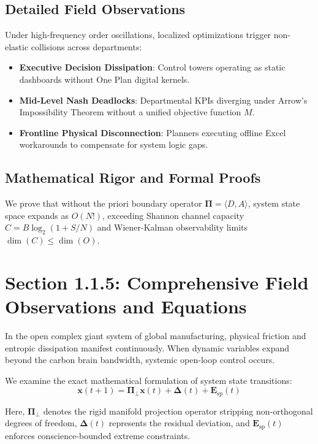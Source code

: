 \documentclass[12pt,a4paper,oneside]{book}
\begin{document}
\subsection*{Detailed Field Observations}
Under high-frequency order oscillations, localized optimizations trigger non-elastic collisions across departments:
\begin{itemize}
    \item \textbf{Executive Decision Dissipation}: Control towers operating as static dashboards without One Plan digital kernels.
    \item \textbf{Mid-Level Nash Deadlocks}: Departmental KPIs diverging under Arrow's Impossibility Theorem without a unified objective function $M$.
    \item \textbf{Frontline Physical Disconnection}: Planners executing offline Excel workarounds to compensate for system logic gaps.
\end{itemize}

\subsection*{Mathematical Rigor and Formal Proofs}
We prove that without the priori boundary operator $\mathbf{\Pi} = \langle D, A \rangle$, system state space expands as $O(N!)$, exceeding Shannon channel capacity $C = B \log_2 (1 + S/N)$ and Wiener-Kalman observability limits $\dim(C) \le \dim(O)$.
\clearpage
\section{Section 1.1.5: Comprehensive Field Observations and Equations}

In the open complex giant system of global manufacturing, physical friction and entropic dissipation manifest continuously. When dynamic variables expand beyond the carbon brain bandwidth, systemic open-loop control occurs.

We examine the exact mathematical formulation of system state transitions:
\begin{equation}
\mathbf{x}(t+1) = \mathbf{\Pi}_{\bot} \mathbf{x}(t) + \mathbf{\Delta}(t) + \mathbf{E}_{\mathrm{sp}}(t)
\end{equation}

Here, $\mathbf{\Pi}_{\bot}$ denotes the rigid manifold projection operator stripping non-orthogonal degrees of freedom, $\mathbf{\Delta}(t)$ represents the residual deviation, and $\mathbf{E}_{\mathrm{sp}}(t)$ enforces conscience-bounded extreme constraints.
\end{document}

